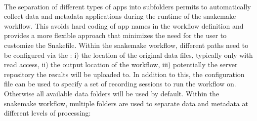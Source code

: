 \renewcommand*\DTstylecomment{\color{gray}\textit}
\renewcommand*\DTstyle{\textcolor{black!90}}
\begin{minipage}[t]{\textwidth}
\ \\
\end{minipage}

The separation of different types of apps into subfolders permits to automatically collect data and metadata applications during the runtime of the snakemake workflow. This avoids hard coding of app names in the workflow definition and provides a more flexible approach that minimizes the need for the user to customize the Snakefile.
Within the snakemake workflow, different paths need to be configured via the : i) the location of the original data files, typically only with read access, ii) the output location of the workflow, iii) potentially the server repository the results will be uploaded to. In addition to this, the configuration file can be used to specify a set of recording sessions to run the workflow on. Otherwise all available data folders will be used by default.
Within the snakemake workflow, multiple folders are used to separate data and metadata at different levels of processing:\\

